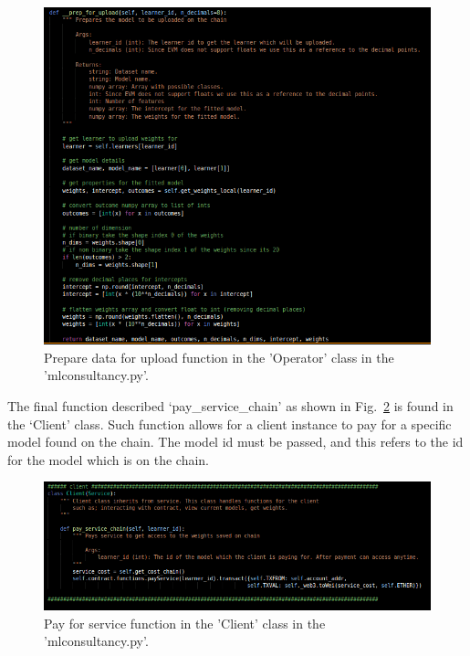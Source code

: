 \begin{figure}[H]
\centering
  \includegraphics[scale = .53]{imgs/model_sol_py_4.png}
  \caption{Prepare data for upload function in the 'Operator' class in the 'mlconsultancy.py'.}
  \label{fig:model_sol_py_4}
\end{figure}

\noindent
The final function described ‘pay\_service\_chain’ as shown in Fig.~\ref{fig:model_sol_py_5} is found in the ‘Client’ class. Such function allows for a client instance to pay for a specific model found on the chain. The model id must be passed, and this refers to the id for the model which is on the chain.  

\begin{figure}[H]
\centering
  \includegraphics[scale = .65]{imgs/model_sol_py_5.png}
  \caption{Pay for service function in the 'Client' class in the 'mlconsultancy.py'.}
  \label{fig:model_sol_py_5}
\end{figure}

